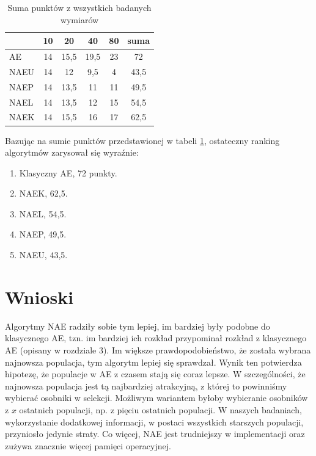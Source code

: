 \documentclass[12pt, a4paper]{article}
\begin{document}
\begin{table}[H]
\centering
\begin{tabular}{ l | c | c | c | c | c }
         & 10  & 20   & 40   & 80  & suma \\ \hline
AE       & 14  & 15,5 & 19,5 & 23  & 72   \\ 
NAEU     & 14  & 12   & 9,5  & 4   & 43,5 \\ 
NAEP     & 14  & 13,5 & 11   & 11  & 49,5 \\ 
NAEL     & 14  & 13,5 & 12   & 15  & 54,5 \\
NAEK     & 14  & 15,5 & 16   & 17  & 62,5 \\ 
\end{tabular}
\caption{Suma punktów z wszystkich badanych wymiarów}
\label{table:sum}
\end{table}

Bazując na sumie punktów przedstawionej w tabeli \ref{table:sum}, ostateczny ranking
algorytmów zarysował się wyraźnie:

\begin{enumerate}
 \item Klasyczny AE, 72 punkty.
 \item NAEK, 62,5.
 \item NAEL, 54,5.
 \item NAEP, 49,5.
 \item NAEU, 43,5.
\end{enumerate}

\section{Wnioski}

Algorytmy NAE radziły sobie tym lepiej, im bardziej były podobne do klasycznego AE, tzn. 
im bardziej ich rozkład przypominał rozkład z klasycznego AE (opisany w rozdziale 3). 
Im większe prawdopodobieństwo, że została wybrana najnowsza populacja, 
tym algorytm lepiej się sprawdzał. Wynik ten potwierdza hipotezę, że populacje w AE
z czasem stają się coraz lepsze. W szczególności, że najnowsza populacja jest tą najbardziej 
atrakcyjną, z której to powinniśmy wybierać osobniki w selekcji. Możliwym wariantem byłoby
wybieranie osobników z $x$ ostatnich populacji, np. z pięciu ostatnich populacji.
W naszych badaniach, wykorzystanie dodatkowej informacji, w postaci wszystkich starszych populacji, 
przyniosło jedynie straty. Co więcej, NAE jest trudniejszy w implementacji
oraz zużywa znacznie więcej pamięci operacyjnej.

\nocite{*}


\end{document}
